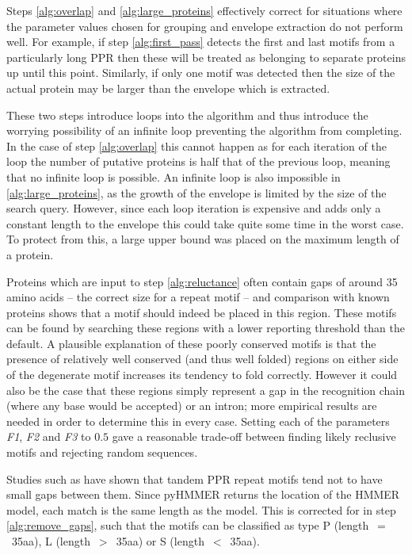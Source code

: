 Steps \ref{alg:overlap} and \ref{alg:large_proteins} effectively correct for
situations where the parameter values chosen for grouping and envelope
extraction do not perform well.
For example, if step \ref{alg:first_pass} detects the first and last motifs
from a particularly long PPR then these will be treated as belonging to 
separate proteins up until this point.
Similarly, if only one motif was detected then the size of the actual protein
may be larger than the envelope which is extracted.

These two steps introduce loops into the algorithm and thus introduce the
worrying possibility of an infinite loop preventing the algorithm from
completing.
In the case of step \ref{alg:overlap} this cannot happen as for each
iteration of the loop the number of putative proteins is half that of the
previous loop, meaning that no infinite loop is possible.
An infinite loop is also impossible in \ref{alg:large_proteins}, as the growth
of the envelope is limited by the size of the search query. 
However, since each loop iteration is expensive and adds only a constant 
length to the envelope this could take quite some time in the worst case.
To protect from this, a large upper bound was placed on the maximum length of 
a protein.

Proteins which are input to step \ref{alg:reluctance} often contain gaps of
around 35 amino acids -- the correct size for a repeat motif -- and comparison
with known proteins shows that a motif should indeed be placed in this region.
These motifs can be found by searching these regions with a lower reporting
threshold than the default.
A plausible explanation of these poorly conserved motifs is that the presence of
relatively well conserved (and thus well folded) regions on either side of the
degenerate motif increases its tendency to fold correctly.
However it could also be the case that these regions simply represent a gap in
the recognition chain (where any base would be accepted) or an intron; more
empirical results are needed in order to determine this in every case.
Setting each of the parameters \emph{F1}, \emph{F2} and \emph{F3} to $0.5$ 
gave a reasonable trade-off between finding likely reclusive motifs and 
rejecting random sequences.

Studies such as \citet{Lurin2004} have shown that tandem PPR repeat motifs tend
not to have small gaps between them.
Since pyHMMER returns the location of the HMMER model, each match is the same
length as the model.
This is corrected for in step \ref{alg:remove_gaps}, such that the motifs can
be classified as type P (length~$=$~35aa), L (length~$>$~35aa) or 
S (length~$<$~35aa).

